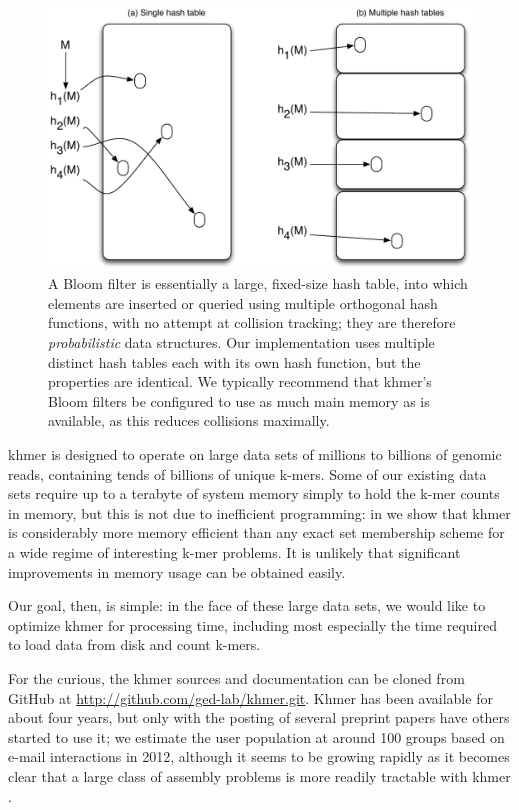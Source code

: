 \documentclass{article}
\begin{document}
\begin{figure}[ht!]
\centering
\includegraphics[scale=0.5]{bloomFilter.pdf}

\caption{A Bloom filter is essentially a large, fixed-size hash
  table, into which elements are inserted or queried using multiple
  orthogonal hash functions, with no attempt at collision tracking;
  they are therefore {\em probabilistic} data structures.  Our
  implementation uses multiple distinct hash tables each with its own
  hash function, but the properties are identical.  We typically
  recommend that khmer's Bloom filters be configured to use as much
  main memory as is available, as this reduces collisions maximally.}

\label{bloomFilter}
\end{figure}

khmer is designed to operate on large data sets of millions to billions of
genomic reads, containing tends of billions of unique k-mers.  Some of our
existing data sets require up to a terabyte of system memory simply to
hold the k-mer counts in memory, but this is not due to inefficient
programming: in \cite{kmer-percolation} we show that khmer is considerably more
memory efficient than any exact set membership scheme for a wide regime
of interesting k-mer problems.  It is unlikely that significant improvements
in memory usage can be obtained easily.

Our goal, then, is simple: in the face of these large data sets, we
would like to optimize khmer for processing time, including most especially
the time required to load data from disk and count k-mers.

For the curious, the khmer sources and documentation can be cloned
from GitHub at \url{http://github.com/ged-lab/khmer.git}.  Khmer has
been available for about four years, but only with the posting of
several preprint papers have others started to use it; we estimate the
user population at around 100 groups based on e-mail interactions in
2012, although it seems to be growing rapidly as it becomes clear
that a large class of assembly problems is more readily
tractable with khmer \cite{diginorm}.
\end{document}
